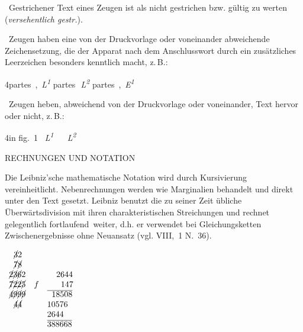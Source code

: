 \vspace{6pt}
\noindent\textemdash\ Gestrichener Text eines Zeugen ist als nicht gestrichen bzw. gültig zu werten (\textit{versehentlich gestr.}).
\par
\noindent\textemdash\ Zeugen haben eine von der Druckvorlage oder voneinander abweichende Zeichensetzung, die der Apparat nach dem Anschlusswort durch ein zusätzliches Leerzeichen besonders kenntlich macht, z.\,B.:\par %
{\footnotesize%
4\hspace{5mm}partes~,~\textit{L\textsuperscript{1}}\quad
partes\,~\textit{L\textsuperscript{2}}\quad
partes~,~\textit{E\textsuperscript{1}}
}%
\par
\vspace{6pt}
\noindent\textemdash\ Zeugen heben, abweichend von der Druckvorlage oder voneinander, Text hervor oder nicht, z.\,B.:\par %
{\footnotesize%
4\hspace{5mm}in \hspace{0,5mm} fig.~1%
~\textit{L\textsuperscript{1}}\quad
\hspace{0,5mm} ~%
~\textit{L\textsuperscript{2}}%
}%
\par 
\vspace{3.0ex}
%
\newpage
\noindent\uppercase{Rechnungen und Notation}\par\vspace{1.0ex}
\noindent Die Leibniz'sche mathematische Notation wird durch Kursivierung verein\-heitlicht. Nebenrechnungen werden wie Marginalien behandelt und direkt unter den Text gesetzt. Leibniz benutzt die zu seiner Zeit übliche Überwärtsdivision mit ihren charakteristischen Streichungen und rechnet gelegentlich \glqq fortlaufend\grqq\ weiter, d.h. er verwendet bei Gleichungsketten Zwischenergebnisse ohne Neuansatz (vgl. VIII,~1 N.~36).\par
\begin{center}
$\begin{array}{lllr}             
\hspace{5.5pt}\cancel{3}2&&&\\
\hspace{5.5pt}\cancel{7}\cancel{8}&&&\\
\cancel{2}\cancel{3}\cancel{6}2&&\hspace{11pt}2644&\\
\cancel{7}\cancel{2}\cancel{2}\cancel{5}&f&\hspace{16.5pt}147&\\
\cancel{4}\cancel{9}\cancel{9}\cancel{9}&&\overline{\hspace{5.5pt}18508}&\\
\hspace{5.5pt}\cancel{4}\cancel{4}&&10576&\\
  &&2644&\\
  &&\overline{388668}&
 \end{array}$  
\end{center}
